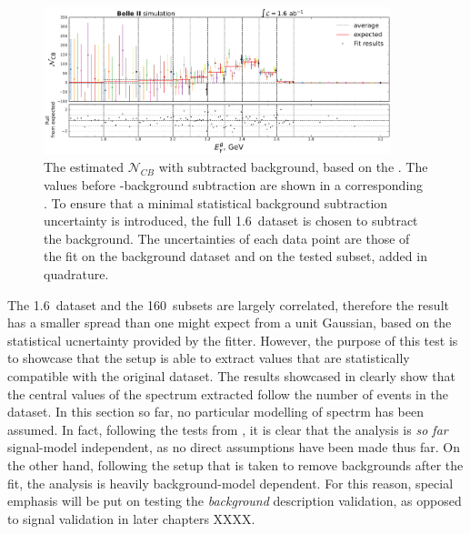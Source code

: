 \begin{figure}[htbp!]
    \includegraphics[width=0.9\textwidth]{figures/mc_validation/subtracted_signal_generic_mc.pdf}
    \caption{\label{fig:subtracted_validation_mc}
    The estimated $\mathcal{N}_{CB}$ with subtracted background, based on the .
    The values before \BB-background subtraction are shown in a corresponding .
    To ensure that a minimal statistical background subtraction uncertainty is introduced, the full 1.6~\invab dataset is chosen to subtract the background.
    The uncertainties of each data point are those of the \Mbc fit on the background dataset and on the tested subset, added in quadrature.
    }
\end{figure}

The 1.6~\invab dataset and the 160~\invfb subsets are largely correlated, therefore the result has a smaller spread than one might expect from a unit Gaussian, based on the statistical ucnertainty provided by the fitter.
However, the purpose of this test is to showcase that the setup is able to extract values that are statistically compatible with the original dataset.
The results showcased in  clearly show that the central values of the \EB spectrum extracted follow the number of \BtoXsgamma events in the dataset.
In this section so far, no particular modelling of \BtoXsgamma spectrm has been assumed.
In fact, following the tests from , it is clear that the analysis is \textit{so far} signal-model independent, as no direct assumptions have been made thus far.
On the other hand, following the setup that is taken to remove \BB backgrounds after the \Mbc fit, the analysis is heavily background-model dependent.
For this reason, special emphasis will be put on testing the \textit{background} description validation, as opposed to signal validation in later chapters XXXX.

